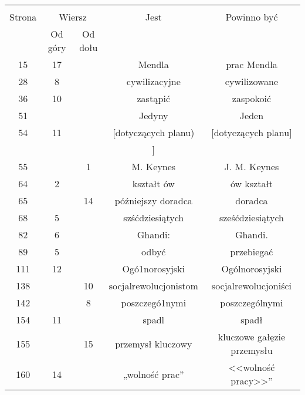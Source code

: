 \documentclass[a4paper,11pt]{article}
\begin{document}
\start {}

\vspace{\spaceFour}



\start {}

\vspace{\spaceFour}



\start {}





\newpage
{}


\begin{center}

  \begin{tabular}{|c|c|c|c|c|}
    \hline
    & \multicolumn{2}{c|}{} & & \\
    Strona & \multicolumn{2}{c|}{Wiersz} & Jest
                              & Powinno być \\ \cline{2-3}
    & Od góry & Od dołu & & \\
    \hline
    15  & 17 & & Mendla & prac Mendla \\
    28  &  8 & & cywilizacyjne & cywilizowane \\
    36  & 10 & & zastąpić & zaspokoić \\
    51  & & & Jedyny & Jeden \\ %
    54  & 11 & & [dotyczących planu) & [dotyczących planu] \\
    & & & ] & \\
    55  & &  1 & M. Keynes & J. M. Keynes \\
    64  &  2 & & kształt ów & ów kształt \\
    65  & & 14 & późniejszy doradca & doradca \\
    68  &  5 & & szśćdziesiątych & sześćdziesiątych \\
    82  &  6 & & Ghandi: & Ghandi. \\
    89  &  5 & & odbyć & przebiegać \\
    111 & 12 & & Ogó1norosyjski & Ogólnorosyjski \\
    138 & & 10 & socjalrewolucjonistom & socjalrewolucjoniści \\
    142 & &  8 & poszczegó1nymi & poszczególnymi \\
    154 & 11 & & spadl & spadł \\
    155 & & 15 & przemysł kluczowy & kluczowe gałęzie przemysłu \\
    160 & 14 & & „wolność prac” & <<wolność pracy>>” \\

\end{tabular}
\end{center}
\end{document}
